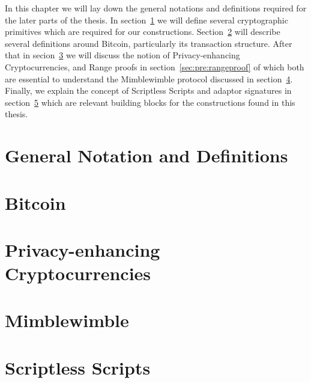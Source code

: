 In this chapter we will lay down the general notations and definitions required for the later parts of the thesis.
In section~\ref{sec:pre:general} we will define several cryptographic primitives which are required for our constructions.
Section~\ref{sec:pre:bitcoin} will describe several definitions around Bitcoin, particularly its transaction structure.
After that in secion~\ref{sec:pre:privacy} we will discuss the notion of Privacy-enhancing Cryptocurrencies, and Range proofs in section~\ref{sec:pre:rangeproof} of which both are essential to understand the Mimblewimble protocol discussed in section~\ref{sec:pre:mimblewimble}.
Finally, we explain the concept of Scriptless Scripts and adaptor signatures in section~\ref{sec:pre:scriptless-scripts} which are relevant building blocks for the constructions found in this thesis.

\section{General Notation and Definitions}\label{sec:pre:general}


\section{Bitcoin} \label{sec:pre:bitcoin}


\section{Privacy-enhancing Cryptocurrencies} \label{sec:pre:privacy}


\section{Mimblewimble} \label{sec:pre:mimblewimble}


\section{Scriptless Scripts} \label{sec:pre:scriptless-scripts}


